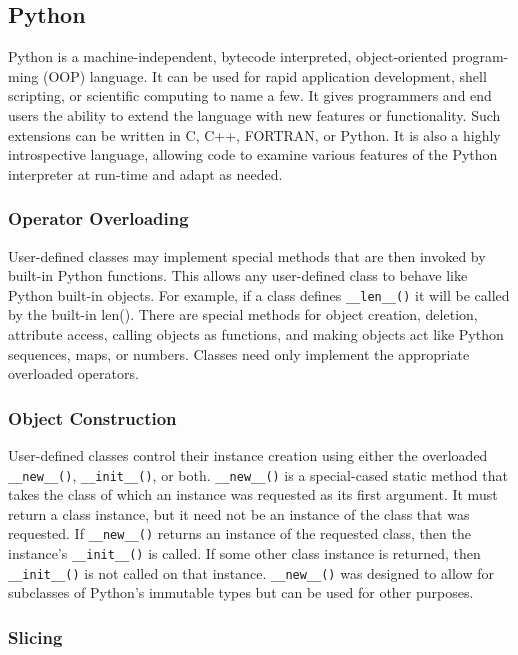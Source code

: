 \documentclass{sigplanconf}
\begin{document}
\subsection{Python}

Python \cite{Lun01,Pyt11} is a machine-independent, bytecode interpreted,
object-oriented program- ming (OOP) language. It can be used for rapid
application development, shell scripting, or scientific computing to name a
few. It gives programmers and end users the ability to extend the language
with new features or functionality. Such extensions can be written in C, C++,
FORTRAN, or Python. It is also a highly introspective language, allowing code
to examine various features of the Python interpreter at run-time and adapt as
needed.

\subsubsection{Operator Overloading}

User-defined classes may implement special methods that are then invoked by
built-in Python functions. This allows any user-defined class to behave like
Python built-in objects. For example, if a class defines \verb=__len__()= it
will be called by the built-in len(). There are special methods for object
creation, deletion, attribute access, calling objects as functions, and making
objects act like Python sequences, maps, or numbers. Classes need only
implement the appropriate overloaded operators.

\subsubsection{Object Construction}

User-defined classes control their instance creation using either the
overloaded \verb=__new__()=, \verb=__init__()=, or both. \verb=__new__()= is a
special-cased static method that takes the class of which an instance was
requested as its first argument. It must return a class instance, but it need
not be an instance of the class that was requested. If \verb=__new__()=
returns an instance of the requested class, then the instance’s
\verb=__init__()= is called. If some other class instance is returned, then
\verb=__init__()= is not called on that instance.  \verb=__new__()= was
designed to allow for subclasses of Python’s immutable types but can be used
for other purposes.

\subsubsection{Slicing}
\end{document}
